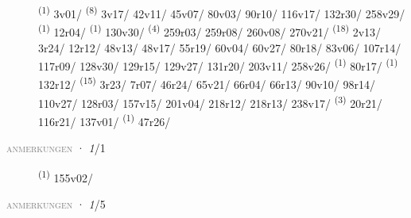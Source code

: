 \begin{description}
    \item[]  \textsuperscript{(1)} \mbox{3v01/} \textsuperscript{(8)} \mbox{3v17/} \mbox{42v11/} \mbox{45v07/} \mbox{80v03/} \mbox{90r10/} \mbox{116v17/} \mbox{132r30/} \mbox{258v29/} \textsuperscript{(1)} \mbox{12r04/} \textsuperscript{(1)} \mbox{130v30/} \textsuperscript{(4)} \mbox{259r03/} \mbox{259r08/} \mbox{260v08/} \mbox{270v21/} \CASEBREAK {} \textsuperscript{(18)} \mbox{2v13/} \mbox{3r24/} \mbox{12r12/} \mbox{48v13/} \mbox{48v17/} \mbox{55r19/} \mbox{60v04/} \mbox{60v27/} \mbox{80r18/} \mbox{83v06/} \mbox{107r14/} \mbox{117r09/} \mbox{128v30/} \mbox{129r15/} \mbox{129v27/} \mbox{131r20/} \mbox{203v11/} \mbox{258v26/} \textsuperscript{(1)} \mbox{80r17/} \textsuperscript{(1)} \mbox{132r12/} \CASEBREAK {} \textsuperscript{(15)} \mbox{3r23/} \mbox{7r07/} \mbox{46r24/} \mbox{65v21/} \mbox{66r04/} \mbox{66r13/} \mbox{90v10/} \mbox{98r14/} \mbox{110v27/} \mbox{128r03/} \mbox{157v15/} \mbox{201v04/} \mbox{218r12/} \mbox{218r13/} \mbox{238v17/} \textsuperscript{(3)} \mbox{20r21/} \mbox{116r21/} \mbox{137v01/} \textsuperscript{(1)} \mbox{47r26/}
\end{description}
\textsc{\textcolor{gray}{anmerkungen}}
\ENTRYEND
\noindent{} · \textit{1}/1 \LEMMALINE
\begin{description}
    \item[]  \textsuperscript{(1)} \mbox{155v02/}
\end{description}
\textsc{\textcolor{gray}{anmerkungen}}
\ENTRYEND
\noindent{} · \textit{1}/5 \LEMMALINE
